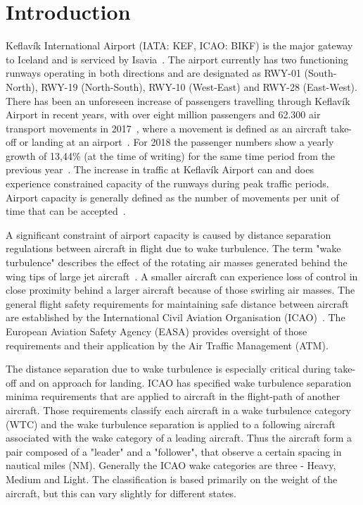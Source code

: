 \chapter{Introduction\label{cha:introduction}}

Keflavík International Airport (IATA: KEF, ICAO: BIKF) is the major gateway to Iceland and is serviced by Isavia~\cite{Isavia_about}. The airport currently has two functioning runways operating in both directions and are designated as RWY-01 (South-North), RWY-19 (North-South), RWY-10 (West-East) and RWY-28 (East-West). 
There has been an unforeseen increase of passengers travelling through Keflavík Airport in recent years, with over eight million passengers and 62.300 air transport movements in 2017~\cite{isavia_facts_2017}, where a movement is defined as an aircraft take-off or landing at an airport~\cite{aircraft_movement}. For 2018 the passenger numbers show a yearly growth of 13,44\% (at the time of writing) for the same time period from the previous year~\cite{isavia_pass_statistics_2018}. The increase in traffic at Keflavík Airport can and does experience constrained capacity of the runways during peak traffic periods. Airport capacity is generally defined as the number of movements per unit of time that can be accepted~\cite{airport_capacity_methodology}.  

A significant constraint of airport capacity is caused by distance separation regulations between aircraft in flight due to wake turbulence. The term "wake turbulence" describes the effect of the rotating air masses generated behind the wing tips of large jet aircraft~\cite{doc4444full}. A smaller aircraft can experience loss of control in close proximity behind a larger aircraft because of those swirling air masses. The general flight safety requirements for maintaining safe distance between aircraft are established by the International Civil Aviation Organisation (ICAO)~\cite{doc4444full}. The European Aviation Safety Agency (EASA) provides oversight of those requirements and their application by the Air Traffic Management (ATM). 

The distance separation due to wake turbulence is especially critical during take-off and on approach for landing. ICAO has specified wake turbulence separation minima requirements that are applied to aircraft in the flight-path of another aircraft. Those requirements classify each aircraft in a wake turbulence category (WTC) and the wake turbulence separation is applied to a following aircraft associated with the wake category of a leading aircraft. Thus the aircraft form a pair composed of a "leader" and a "follower", that observe a certain spacing in nautical miles (NM). Generally the ICAO wake categories are three - Heavy, Medium and Light. The classification is based primarily on the weight of the aircraft, but this can vary slightly for different states.

